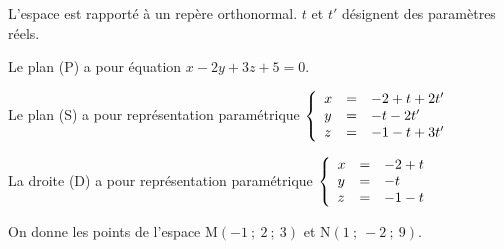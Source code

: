 \documentclass[10pt]{article}
\begin{document}
L'espace est rapporté à un repère orthonormal. $t$ et $t'$ désignent des paramètres réels.

Le plan (P) a pour équation $x - 2y + 3z + 5 = 0$. 

Le plan (S) a pour représentation paramétrique $\left\{\begin{array}{l c l}
x&=&- 2 + t + 2t'\\
y&=&- t - 2t'\\
z&=&- 1 - t + 3t'
\end{array}\right.$ 

La droite (D) a pour représentation paramétrique $\left\{\begin{array}{l c l}
x&=&- 2 + t\\
y&=&- t \\
z&=&- 1 - t
\end{array}\right.$
 
On donne les points de l'espace M$(-1~;~2~;~3)$ et N$(1~;~-2~;~9)$.

\medskip
 
\end{document}
